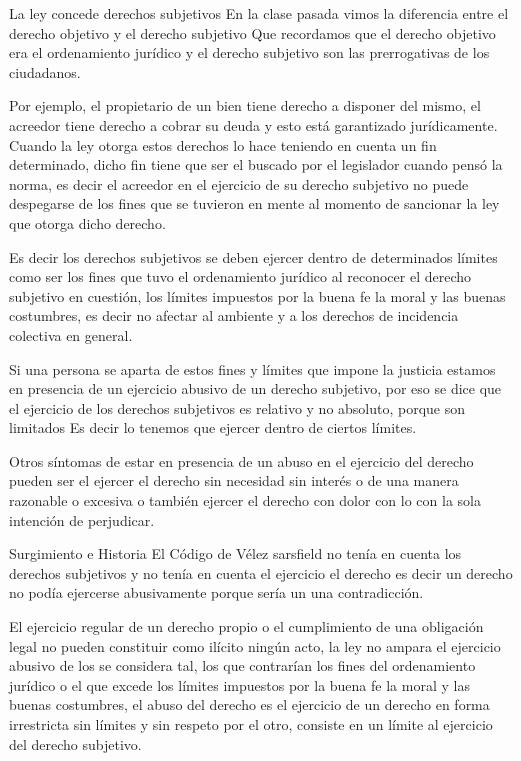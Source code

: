 \documentclass[12pt]{book}
\begin{document}
La ley concede derechos subjetivos
En la clase pasada vimos la diferencia entre el derecho objetivo y el derecho subjetivo Que recordamos que el derecho objetivo era el ordenamiento jurídico y el derecho subjetivo son las prerrogativas de los ciudadanos.

Por ejemplo, el propietario de un bien tiene derecho a disponer del mismo, el acreedor tiene derecho a cobrar su deuda y esto está garantizado jurídicamente. Cuando la ley otorga estos derechos lo hace teniendo en cuenta un fin determinado, dicho fin tiene que ser el buscado por el legislador cuando pensó la norma, es decir el acreedor en el ejercicio de su derecho subjetivo no puede despegarse de los fines que se tuvieron en mente al momento de sancionar la ley que otorga dicho derecho.


Es decir los derechos subjetivos se deben ejercer dentro de determinados límites como ser los fines que tuvo el ordenamiento jurídico al reconocer el derecho subjetivo en cuestión, los límites impuestos por la buena fe la moral y las buenas costumbres, es decir no afectar al ambiente y a los derechos de incidencia colectiva en general.

Si una persona se aparta de estos fines y límites que impone la justicia estamos en presencia de un ejercicio abusivo de un derecho subjetivo, por eso se dice que el ejercicio de los derechos subjetivos es relativo y no absoluto, porque son limitados  Es decir lo tenemos que ejercer dentro de ciertos límites. 

Otros síntomas de estar en presencia de un abuso en el ejercicio del derecho pueden ser el ejercer el derecho sin necesidad sin interés o de una manera razonable o excesiva o también ejercer el derecho con dolor con lo con la sola intención de perjudicar.


Surgimiento e Historia
El Código de Vélez sarsfield no tenía en cuenta los derechos subjetivos y no tenía en cuenta el ejercicio el derecho es decir un derecho no podía ejercerse abusivamente porque sería un una contradicción.

El ejercicio regular de un derecho propio o el cumplimiento de una obligación legal no pueden constituir como ilícito ningún acto, la ley no ampara el ejercicio abusivo de los 
se considera tal, los que contrarían los fines del ordenamiento jurídico o el que excede los límites impuestos por la buena fe la moral y las buenas costumbres, el abuso del derecho es el ejercicio de un derecho en forma irrestricta sin límites y sin respeto por el otro, consiste en un límite al ejercicio del derecho subjetivo.
\end{document}
